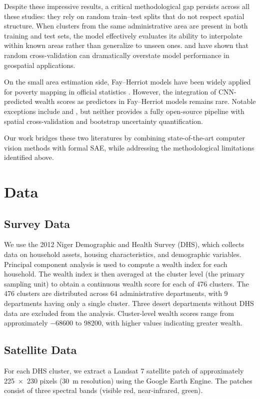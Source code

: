 \documentclass[11pt,a4paper]{article}
\begin{document}
Despite these impressive results, a critical methodological gap persists across all these studies: they rely on random train--test splits that do not respect spatial structure. When clusters from the same administrative area are present in both training and test sets, the model effectively evaluates its ability to interpolate within known areas rather than generalize to unseen ones. \citet{meyer2018} and \citet{karasiak2022} have shown that random cross-validation can dramatically overstate model performance in geospatial applications.

On the small area estimation side, Fay--Herriot models \citep{fay1979} have been widely applied for poverty mapping in official statistics \citep{rao2015, you2021}. However, the integration of CNN-predicted wealth scores as predictors in Fay--Herriot models remains rare. Notable exceptions include \citet{marhuenda2017} and \citet{ratledge2021}, but neither provides a fully open-source pipeline with spatial cross-validation and bootstrap uncertainty quantification.

Our work bridges these two literatures by combining state-of-the-art computer vision methods with formal SAE, while addressing the methodological limitations identified above.

\section{Data}
\label{sec:data}

\subsection{Survey Data}
We use the 2012 Niger Demographic and Health Survey (DHS), which collects data on household assets, housing characteristics, and demographic variables. Principal component analysis is used to compute a wealth index for each household. The wealth index is then averaged at the cluster level (the primary sampling unit) to obtain a continuous wealth score for each of 476 clusters. The 476 clusters are distributed across 64 administrative departments, with 9 departments having only a single cluster. Three desert departments without DHS data are excluded from the analysis. Cluster-level wealth scores range from approximately \num{-68600} to \num{+98200}, with higher values indicating greater wealth.

\subsection{Satellite Data}
For each DHS cluster, we extract a Landsat 7 satellite patch of approximately 225~$\times$~230 pixels (30~m resolution) using the Google Earth Engine. The patches consist of three spectral bands (visible red, near-infrared, green).
\end{document}
